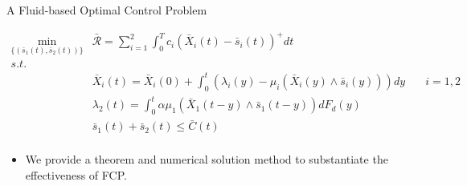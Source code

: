 \documentclass[smaller ,table,usenames,dvipsnames]{beamer}
\newcommand{\?}{\stackrel{?}{=}}
\begin{document}
\begin{frame}{A Fluid-based Optimal Control Problem}

\small
\begin{equation*}
\begin{array}{clr}
\displaystyle \min\limits_{\{(\bar{s}_1(t),\bar{s}_2(t))\} } &  \displaystyle \mathcal{\bar{R}}=\sum_{i=1}^2\int_{0}^{T} c_i\left( \bar{X}_i(t) - \bar{s}_i(t)\right)^+dt  &\\ [10pt]
\displaystyle s.t. & & \quad \\
& \displaystyle \bar{X}_i(t) = \bar{X}_i(0) + \int_0^t \left(\lambda_i(y) - \mu_i \left( \bar{X}_i(y)\land \bar{s}_i(y) \right)  \right) dy &\quad  i=1,2\\ [12pt]
& \displaystyle \lambda_2(t) =  \int_0^t \alpha\mu_1\left( \bar{X}_1(t-y)\land \bar{s}_1(t-y) \right)dF_d(y) &\\ [10pt]
& \displaystyle \bar{s}_1(t) + \bar{s}_2(t) \leq \bar{C}(t) &\\ [10pt]
\end{array}
\end{equation*}

\begin{itemize}
    \item We provide a theorem and numerical solution method to substantiate the effectiveness of FCP. 
\end{itemize}
\end{frame}
\end{document}
